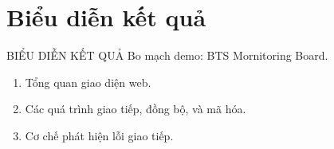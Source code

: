 \section{Biểu diễn kết quả}
\begin{frame}{BIỂU DIỄN KẾT QUẢ}
Bo mạch demo: BTS Mornitoring Board.
	\begin{enumerate}
		\item Tổng quan giao diện web.
		\item Các quá trình giao tiếp, đồng bộ, và mã hóa.
		\item Cơ chế phát hiện lỗi giao tiếp.
	\end{enumerate}
\end{frame}